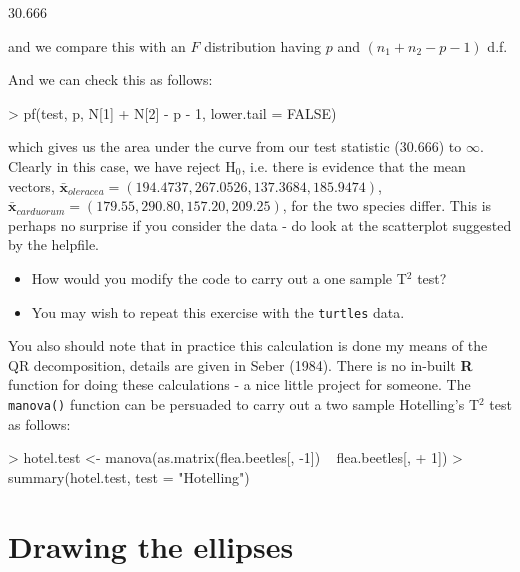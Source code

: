 \begin{Schunk}
\begin{Soutput}
       [,1]
[1,] 30.666
\end{Soutput}
\end{Schunk}


and we compare this with an $F$ distribution having $p$ and $(n_{1} + n_{2} - p - 1)$ d.f.

And we can check this as follows:

\begin{Schunk}
\begin{Sinput}
> pf(test, p, N[1] + N[2] - p - 1, lower.tail = FALSE)
\end{Sinput}
\end{Schunk}

which gives us the area under the curve from our test statistic ($30.666$) to $\infty$.   Clearly in this case, we have reject H$_{0}$, i.e. there is evidence that the mean vectors, $\bar{\boldsymbol{x}}_{oleracea} = (194.4737, 267.0526, 137.3684, 185.9474)$, $\bar{\boldsymbol{x}}_{carduorum} = (179.55, 290.80, 157.20, 209.25)$, 
 for the two species differ.   This is perhaps no surprise if you consider the data - do look at the scatterplot suggested by the helpfile.

\begin{itemize}
\item How would you modify the code to carry out a one sample T$^{2}$ test?
\item You may wish to repeat this exercise with the \texttt{turtles} data.   
\end{itemize}

You also should note that in practice this calculation is done my means of the QR decomposition, details are given in Seber (1984).   There is no in-built \textbf{R} function for doing these calculations - a nice little project for someone.   The \texttt{manova()} function can be persuaded to carry out a two sample Hotelling's T$^{2}$ test as follows:

\begin{Schunk}
\begin{Sinput}
> hotel.test <- manova(as.matrix(flea.beetles[, -1]) ~ flea.beetles[, 
+     1])
> summary(hotel.test, test = "Hotelling")
\end{Sinput}
\end{Schunk}

\section{Drawing the ellipses}



